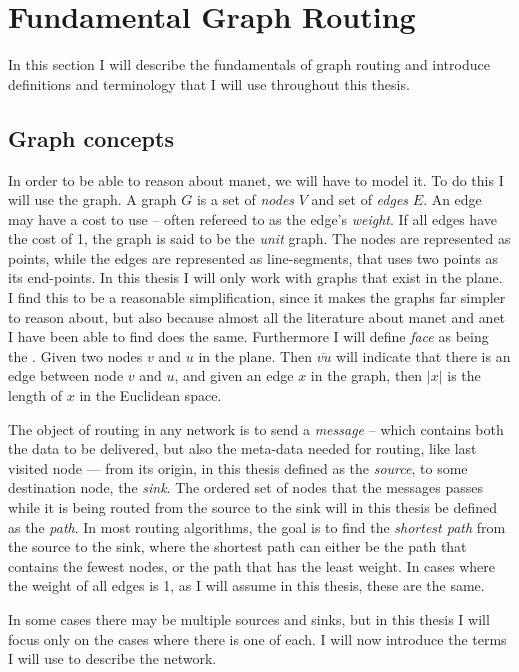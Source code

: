 \section{Fundamental Graph Routing}
\label{section:fundamental_graph_routing}
In this section I will describe the fundamentals of graph routing and introduce definitions and terminology that I will use throughout this thesis.\\

\subsection{Graph concepts}
\label{section:graph_concepts}
In order to be able to reason about \ac{manet}, we will have to model it. To do this I will use the graph. A graph $G$ is a set of \emph{nodes} $V$ and set of \emph{edges} $E$. An edge may have a cost to use -- often refereed to as the edge's \emph{weight}. If all edges have the cost of 1, the graph is said to be the \emph{unit} graph. The nodes are represented as points, while the edges are represented as line-segments, that uses two points as its end-points. In this thesis I will only work with graphs that exist in the plane. I find this to be a reasonable simplification, since it makes the graphs far simpler to reason about, but also because almost all the literature about \ac{manet} and \ac{anet} I have been able to find does the same. Furthermore I will define \emph{face} as being the . Given two nodes $v$ and $u$ in the plane. Then $\overline{vu}$ will indicate that there is an edge between node $v$ and $u$, and given an edge $x$ in the graph, then $|x|$ is the length of $x$ in the Euclidean space.

The object of routing in any network is to send a \emph{message} -- which contains both the data to be delivered, but also the meta-data needed for routing, like last visited node --- from its origin, in this thesis defined as the \emph{source}, to some destination node, the \emph{sink}. The ordered set of nodes that the messages passes while it is being routed from the source to the sink will in this thesis be defined as the \emph{path}. In most routing algorithms, the goal is to find the \emph{shortest path} from the source to the sink, where the shortest path can either be the path that contains the fewest nodes, or the path that has the least weight. In cases where the weight of all edges is 1, as I will assume in this thesis, these are the same. 

In some cases there may be multiple sources and sinks, but in this thesis I will focus only on the cases where there is one of each. I will now introduce the terms I will use to describe the network.


